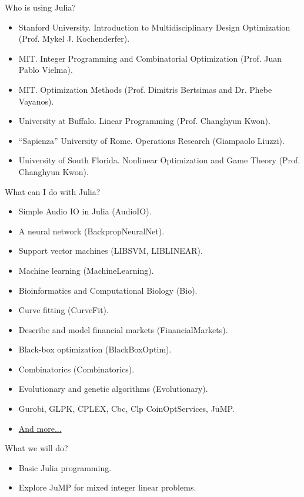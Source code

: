 \documentclass{beamer}
\begin{document}
\begin{frame}{Who is using Julia?}
  \begin{itemize}\footnotesize
  \item[] Stanford University. Introduction to Multidisciplinary Design Optimization (Prof. Mykel J. Kochenderfer).
  \item[] MIT. Integer Programming and Combinatorial Optimization (Prof. Juan Pablo Vielma).
  \item[] MIT. Optimization Methods (Prof. Dimitris Bertsimas and Dr. Phebe Vayanos).
  \item[] University at Buffalo. Linear Programming (Prof. Changhyun Kwon).
  \item[] “Sapienza” University of Rome. Operations Research (Giampaolo Liuzzi).
    \item[] University of South Florida. Nonlinear Optimization and Game Theory (Prof. Changhyun Kwon).
  \end{itemize}
\end{frame}


\begin{frame}{What can I do with Julia?}
  \begin{itemize}\footnotesize
  \item[] Simple Audio IO in Julia (AudioIO).
  \item[] A neural network (BackpropNeuralNet).
  \item[] Support vector machines (LIBSVM, LIBLINEAR).
  \item[] Machine learning (MachineLearning).
  \item[] Bioinformatics and Computational Biology (Bio).
  \item[] Curve fitting (CurveFit).
  \item[] Describe and model financial markets (FinancialMarkets).
  \item[] Black-box optimization (BlackBoxOptim).
  \item[] Combinatorics (Combinatorics).
  \item[] Evolutionary and genetic algorithms (Evolutionary).
  \item[] Gurobi, GLPK, CPLEX, Cbc, Clp CoinOptServices, JuMP.
  \item[] \href{http://pkg.julialang.org/}{And more...}
  \end{itemize}
\end{frame}

\begin{frame}{What we will do?}
  \begin{itemize}
  \item[] Basic Julia programming.
  \item[] Explore JuMP for mixed integer linear problems.
  \end{itemize}
\end{frame}
\end{document}
